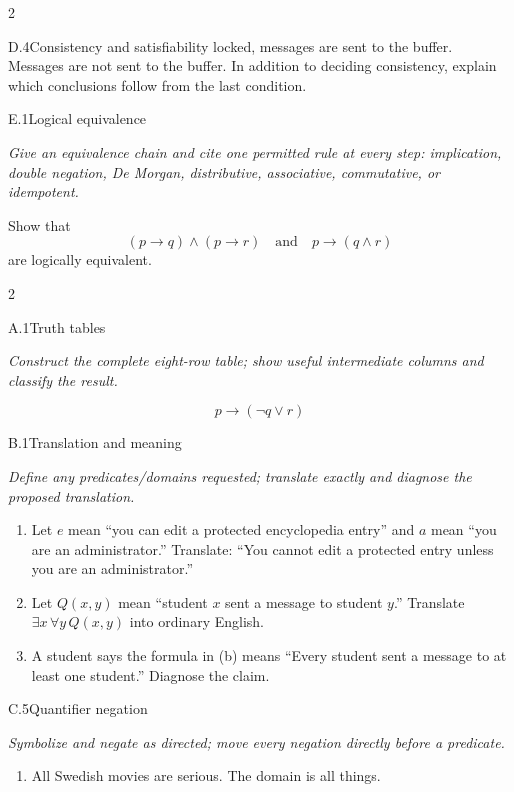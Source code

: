 \documentclass[9pt]{extarticle}
\begin{document}
\begin{multicols}{2}
\begin{CoreProblem}{D.4}{Consistency and satisfiability}
locked, messages are sent to the buffer. Messages are not sent to the buffer.
In addition to deciding consistency, explain which conclusions follow from the
last condition.
\end{CoreProblem}
\begin{CoreProblem}{E.1}{Logical equivalence}
{\scriptsize\textit{Give an equivalence chain and cite one permitted rule at every step: implication, double negation, De Morgan, distributive, associative, commutative, or idempotent.}\par}
Show that
\[
  (p\to q)\land(p\to r)
  \quad\text{and}\quad
  p\to(q\land r)
\]
are logically equivalent.
\end{CoreProblem}
\end{multicols}
\CoreWorkArea
\FormBreak
{}
\begin{multicols}{2}
\begin{CoreProblem}{A.1}{Truth tables}
{\scriptsize\textit{Construct the complete eight-row table; show useful intermediate columns and classify the result.}\par}
\[
  p\to(\neg q\lor r)
\]
\end{CoreProblem}
\begin{CoreProblem}{B.1}{Translation and meaning}
{\scriptsize\textit{Define any predicates/domains requested; translate exactly and diagnose the proposed translation.}\par}
\begin{enumerate}[label=(\alph*)]
  \item Let $e$ mean ``you can edit a protected encyclopedia entry'' and $a$
        mean ``you are an administrator.'' Translate: ``You cannot edit a
        protected entry unless you are an administrator.''
  \item Let $Q(x,y)$ mean ``student $x$ sent a message to student $y$.''
        Translate $\exists x\,\forall y\,Q(x,y)$ into ordinary English.
  \item A student says the formula in (b) means ``Every student sent a message
        to at least one student.'' Diagnose the claim.
\end{enumerate}
\end{CoreProblem}
\begin{CoreProblem}{C.5}{Quantifier negation}
{\scriptsize\textit{Symbolize and negate as directed; move every negation directly before a predicate.}\par}
\begin{enumerate}[label=(\alph*)]
  \item All Swedish movies are serious. The domain is all things.

\end{enumerate}
\end{CoreProblem}
\end{multicols}
\end{document}
